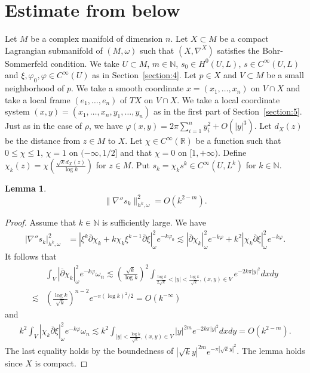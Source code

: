 \documentclass[12pt,oneside]{amsart}
\theoremstyle{plain}
\newtheorem{lemma}{Lemma}
\theoremstyle{definition}
\theoremstyle{remark}
\begin{document}
\section{Estimate from below}\label{section:3}
Let $M$ be a complex manifold of dimension $n$.  
Let $X \subset M$ be a compact Lagrangian submanifold of $(M, \omega)$ such that $(X, \nabla^{X})$ satisfies the Bohr-Sommerfeld condition.  
We take $U \subset M$, $m \in \mathbb{N}$, $s_0 \in H^{0}(U, L)$, $s \in C^{\infty}(U, L)$ and $\xi, \varphi_{0}, \varphi \in C^{\infty}(U)$ as in Section~\ref{section:4}.  
Let $p \in X$ and $V \subset M$ be a small neighborhood of $p$.  
We take a smooth coordinate $x = (x_{1}, \ldots, x_{n})$ on $V \cap X$ and take a local frame $(e_{1}, \ldots, e_{n})$ of $TX$ on $V \cap X$.  
We take a local coordinate system $(x, y) = (x_{1}, \ldots, x_{n}, y_{1}, \ldots, y_{n})$ as in the first part of Section~\ref{section:5}.  
Just as in the case of $\rho$, 
we have 
$\varphi(x, y) = 2\pi \sum_{i=1}^n y_i^2 + O(|y|^3)$.  
Let $d_{X}(z)$ be the distance from $z \in M$ to $X$.  
Let $\chi \in C^{\infty}(\mathbb{R})$ be a function such that $0 \leq \chi \leq 1$, $\chi = 1$ on $(-\infty, 1/2]$ and that $\chi = 0$ on $[1, +\infty)$.  
Define $\chi_{k}(z) = \chi(\frac{\sqrt{k}d_{X}(z)}{\log k})$ for $z \in M$.   
Put $s_{k} = \chi_{k} s^k \in C^{\infty}(U, L^k)$ for $k \in \mathbb{N}$.  
\begin{lemma}\label{lemma:1}
\[
\|\nabla'' s_{k}\|^2_{h^k, \omega} = O(k^{2-m}).  
\]
\end{lemma}
\begin{proof}
Assume that $k \in \mathbb{N}$ is sufficiently large.  
We have 
\begin{align*}
|\nabla'' s_{k}|^2_{h^k, \omega} & = |\xi^k \overline{\partial}\chi_{k} +k\chi_{k}\xi^{k-1}\overline{\partial}\xi|^2_{\omega} e^{-k\varphi_{0}} \lesssim |\overline{\partial}\chi_{k}|^2_{\omega}e^{-k\varphi} + k^2|\chi_{k}\overline{\partial}\xi|^2_{\omega}e^{-k\varphi}.  
\end{align*}
It follows that 
\begin{align*}
& \int_{V} |\overline{\partial}\chi_{k}|^2_{\omega}e^{-k\varphi} \omega_{n} \lesssim \left(\frac{\sqrt{k}}{\log k}\right)^2 \int_{\frac{\log k}{2\sqrt{k}}< |y| < \frac{\log k}{\sqrt{k}}, (x, y) \in V} e^{-2k\pi|y|^2} dxdy \\
\lesssim & \left(\frac{\log k}{\sqrt{k}}\right)^{n-2}e^{-\pi (\log k)^2/2} 
= O(k^{-\infty})  
\end{align*}
and 
\begin{align*}
k^2 \int_{V} |\chi_{k} \overline{\partial}\xi|^2_{\omega}e^{-k\varphi} \omega_{n} 
\lesssim k^2 \int_{|y|< \frac{\log k}{\sqrt{k}}, (x, y) \in V} |y|^{2m} e^{-2k\pi|y|^2}dxdy = O(k^{2-m}).  
\end{align*}
The last equality holds by the boundedness of $|\sqrt{k}y|^{2m}e^{-\pi|\sqrt{k}y|^2}$.  
The lemma holds since $X$ is compact.  
\end{proof}
\end{document}
